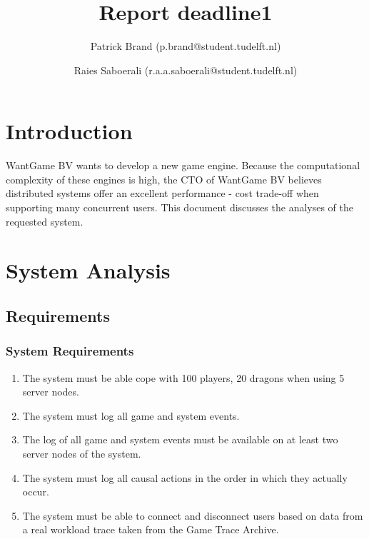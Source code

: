 \documentclass{article}
\title{Report deadline1
}
\author{Patrick Brand (p.brand@student.tudelft.nl) \and
    Raies Saboerali (r.a.a.saboerali@student.tudelft.nl)}
\date{}
\begin{document}
\maketitle
\thispagestyle{empty}

\newpage

\section{Introduction}
WantGame BV wants to develop a new game engine. Because the computational complexity of these engines is high, the CTO of WantGame BV believes distributed systems offer an excellent performance - cost trade-off when supporting many concurrent users. This document discusses the analyses of the requested system.

\section{System Analysis}
\subsection{Requirements}
\subsubsection{System Requirements}
\begin{enumerate}
	\item The system must be able cope with 100 players, 20 dragons when using 5 server nodes.
	\item The system must log all game and system events.
	\item The log of all game and system events must be available on at least two server nodes of the system.
	\item The system must log all causal actions in the order in which they actually occur.
	\item The system must be able to connect and disconnect users based on data from a real workload trace taken from the Game Trace Archive.
\end{enumerate}
\end{document}
